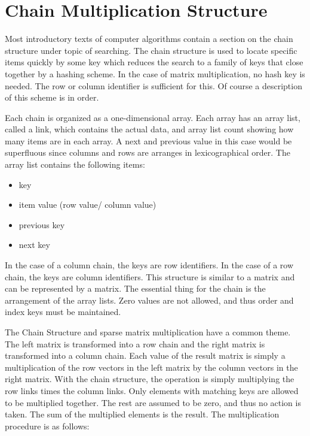 \section{Chain Multiplication Structure}
Most introductory texts of computer algorithms contain a section on the chain structure under topic of searching.  %
The chain structure  is used to %
locate specific items quickly by some key which reduces the search to a family of keys that close together by a hashing scheme.  In the case of matrix multiplication, no hash key is needed.  The row or column identifier is sufficient for this.  Of course a description of this scheme is in order.  

Each chain is organized as a one-dimensional array.  Each array has an array list, called a link, which contains the actual data, and array list count showing how many items are in each array.  A next and previous value in this case would be superfluous since columns and rows are arranges in lexicographical order.  The array list contains the following items:
\begin{itemize}\item key
\item item value (row value/ column value)
\item previous key
\item next key \end{itemize}

In the case of a column chain, the keys are row identifiers.   In the case of a row chain, the keys are column identifiers.  This structure is similar to a matrix and can be represented by a matrix.  The essential thing for the chain is the arrangement of the array lists.  Zero values are not allowed, and thus order and index keys must be maintained.  

The Chain Structure and sparse matrix multiplication have a common theme.  The left matrix is transformed into a row chain and the right matrix is transformed into a column chain.  Each value of the result matrix is simply a multiplication of the row vectors in the left matrix by the column vectors in the right matrix.  With the chain structure, %
the operation is simply multiplying the row links times the column links.  Only elements with matching keys are allowed to be multiplied together.  The rest are assumed to be zero, and thus no action is taken.  The sum of the multiplied elements is the result.  The multiplication procedure is as follows:

